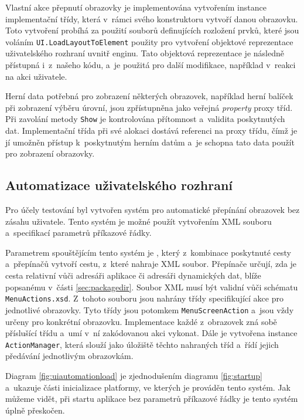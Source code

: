 Vlastní akce přepnutí obrazovky je implementována vytvořením instance implementační třídy, která v~rámci svého konstruktoru vytvoří danou obrazovku. Toto vytvoření probíhá za použití souborů definujících rozložení prvků, které jsou voláním \texttt{UI.LoadLayoutToElement} použity pro vytvoření objektové reprezentace uživatelského rozhraní uvnitř enginu. Tato objektová reprezentace je následně přístupná i~z~našeho kódu, a~je použitá pro další modifikace, například v~reakci na akci uživatele.

Herní data potřebná pro zobrazení některých obrazovek, například herní balíček při zobrazení výběru úrovní, jsou zpřístupněna jako veřejná \textit{property} proxy tříd. Při zavolání metody \texttt{Show} je kontrolována přítomnost a~validita poskytnutých dat. Implementační třída při své alokaci dostává referenci na proxy třídu, čímž je jí umožněn přístup k~poskytnutým herním datům a~je schopna tato data použít pro zobrazení obrazovky.

\subsection{Automatizace uživatelského rozhraní}

Pro účely testování byl vytvořen systém pro automatické přepínání obrazovek bez zásahu uživatele. Tento systém je možné použít vytvořením XML souboru a~specifikací parametrů příkazové řádky.

Parametrem spouštějícím tento systém je , který z~kombinace poskytnuté cesty a~přepínačů  vytvoří cestu, z~které nahraje XML soubor. Přepínače  určují, zda je cesta  relativní vůči adresáři aplikace či adresáři dynamických dat, blíže popsanému v~části \ref{sec:packagedir}. Soubor XML musí být validní vůči schématu \texttt{MenuActions.xsd}. Z~tohoto souboru jsou  nahrány třídy specifikující akce pro jednotlivé obrazovky. Tyto třídy jsou potomkem \texttt{MenuScreenAction} a~jsou vždy určeny pro konkrétní obrazovku. Implementace každé z~obrazovek zná sobě příslušící třídu a~umí v~ní zakódovanou akci vykonat. Dále je vytvořena instance \texttt{ActionManager}, která slouží jako úložiště těchto nahraných tříd a~řídí jejich předávání jednotlivým obrazovkám.

Diagram \ref{fig:uiautomationload} je zjednodušením diagramu \ref{fig:startup} a~ukazuje části inicializace platformy, ve kterých je prováděn tento systém. Jak můžeme vidět, při startu aplikace bez parametrů příkazové řádky je tento systém úplně přeskočen. 


